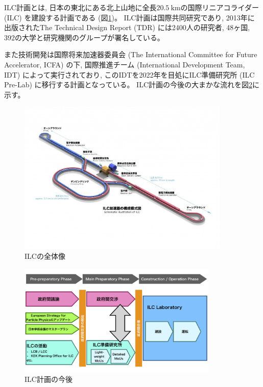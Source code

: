 ILC計画とは, 日本の東北にある北上山地に全長$20.5\ \mathrm{km}$の国際リニアコライダー (ILC) を建設する計画である (図\ref{2InternationalLinearCollider})。
ILC計画は国際共同研究であり, 2013年に出版されたThe Technical Design Report (TDR) \cite{ILCTDRVES} には2400人の研究者, 48ヶ国, 392の大学と研究機関のグループが署名している。

また技術開発は国際将来加速器委員会 (The International Committee for Future Accelerator, ICFA) の下, 国際推進チーム (International Development Team, IDT) によって実行されており, このIDTを2022年を目処にILC準備研究所 (ILC Pre-Lab) に移行する計画となっている。
ILC計画の今後の大まかな流れを図\ref{3ILCProject}に示す。

\begin{figure}[htbp]
 \centering
  \includegraphics[trim = 0 100 0 100, width=0.9\textwidth, clip]{Figure/1Introduction/2InternationalLinearCollider.jpg}
  \caption[ILCの全体像]
                 {ILCの全体像\cite{ILCPHOTO}}
  \label{2InternationalLinearCollider}
\end{figure}

\begin{figure}[htbp]
 \centering
 \includegraphics[width=0.85\textwidth]{Figure/1Introduction/3ILCProject.png}
 \caption[ILC計画の今後]
                {ILC計画の今後\cite{RecommendationsonILCProjectImplementation}}
 \label{3ILCProject}
\end{figure}


